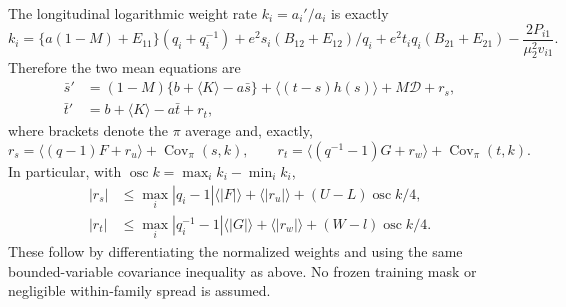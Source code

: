 \documentclass{article} %
\theoremstyle{plain}
\theoremstyle{definition}
\theoremstyle{remark}
\begin{document}
The longitudinal logarithmic weight rate $k_i=a_i'/a_i$ is exactly
\[
 k_i=\{a(1-M)+E_{11}\}(q_i+q_i^{-1})
 +e^2s_i(B_{12}+E_{12})/q_i
 +e^2t_iq_i(B_{21}+E_{21})-\frac{2P_{i1}}{\mu_2^2v_{i1}}.
\]
Therefore the two mean equations are
\begin{align}
 \bar s'&=(1-M)\{b+\langle K\rangle-a\bar s\}
       +\langle(t-s)h(s)\rangle+M\mathcal D+r_s,
       \label{sbemp:mean-input}\\
 \bar t'&=b+\langle K\rangle-a\bar t+r_t,
       \label{sbemp:mean-output}
\end{align}
where brackets denote the $\pi$ average and, exactly,
\[
 r_s=\langle(q-1)F+r_u\rangle+\operatorname{Cov}_\pi(s,k),\qquad
 r_t=\langle(q^{-1}-1)G+r_w\rangle+\operatorname{Cov}_\pi(t,k).
\]
In particular, with $\operatorname{osc}k=\max_i k_i-\min_i k_i$,
\begin{align*}
 |r_s|&\le\max_i|q_i-1|\langle|F|\rangle
       +\langle|r_u|\rangle+(U-L)\operatorname{osc}k/4,\\
 |r_t|&\le\max_i|q_i^{-1}-1|\langle|G|\rangle
       +\langle|r_w|\rangle+(W-l)\operatorname{osc}k/4.
\end{align*}
These follow by differentiating the normalized weights and using the
same bounded-variable covariance inequality as above. No frozen training
mask or negligible within-family spread is assumed.
\end{document}
